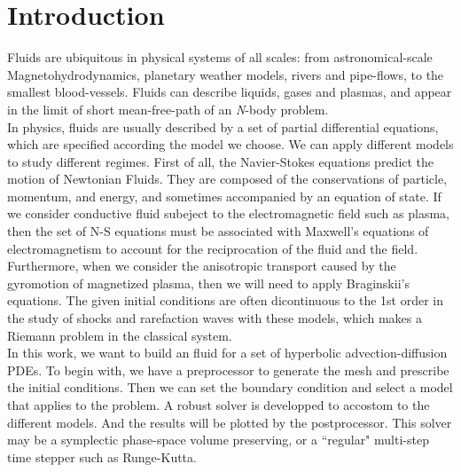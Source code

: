 \section{Introduction}

Fluids are ubiquitous in physical systems of all scales: from astronomical-scale
Magnetohydrodynamics, planetary weather models, rivers and pipe-flows, to the smallest
blood-vessels. Fluids can describe liquids, gases and plasmas, and appear in the limit
of short mean-free-path of an \textit{N}-body problem.\\

In physics, fluids are usually described by a set of partial differential equations,
which are specified according the model we choose. We can apply different models to study different regimes. 
First of all, the Navier-Stokes equations predict the motion of Newtonian Fluids. They are composed of
the conservations of particle, momentum, and energy, and sometimes accompanied by an
equation of state. If we consider conductive fluid subeject to the electromagnetic
field such as plasma, then the set of N-S equations must be associated with Maxwell's
equations of electromagnetism to account for the reciprocation of the fluid and the
field. Furthermore, when we consider the anisotropic transport caused by the gyromotion
of magnetized plasma, then we will need to apply Braginskii's equations. The given
initial conditions are often dicontinuous to the 1st order in the study of shocks and
rarefaction waves with these models, which makes a Riemann problem in the classical
system.\\

In this work, we want to build an fluid for a set of hyperbolic
advection-diffusion PDEs. To begin with, we have a preprocessor to generate the mesh
and prescribe the initial conditions. Then we can set the boundary condition and select
a model that applies to the problem. A robust solver is developped to accostom to the
different models. And the results will be plotted by the postprocessor. This solver
may be a symplectic phase-space volume preserving, or a ``regular" multi-step time stepper such as Runge-Kutta.\\
